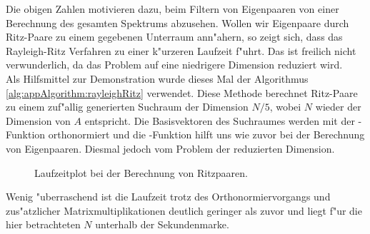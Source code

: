 Die obigen Zahlen motivieren dazu, beim Filtern von Eigenpaaren von einer Berechnung des gesamten Spektrums abzusehen. Wollen wir Eigenpaare durch Ritz-Paare zu einem gegebenen Unterraum ann"ahern, so zeigt sich, dass das Rayleigh-Ritz Verfahren zu einer k"urzeren Laufzeit f"uhrt. Das ist freilich nicht verwunderlich, da das Problem auf eine niedrigere Dimension reduziert wird.\\

Als Hilfsmittel zur Demonstration wurde dieses Mal der Algorithmus \ref{alg:appAlgorithm:rayleighRitz} verwendet. Diese Methode berechnet Ritz-Paare zu einem zuf"allig generierten Suchraum der Dimension $N/5$, wobei $N$ wieder der Dimension von $A$ entspricht. Die Basisvektoren des Suchraumes werden mit der -Funktion orthonormiert und die -Funktion hilft uns wie zuvor bei der Berechnung von Eigenpaaren. Diesmal jedoch vom Problem der reduzierten Dimension.

\newpage

\begin{figure}[h!]
\centering


\caption{Laufzeitplot bei der Berechnung von Ritzpaaren.}\label{fig:chap5:laufzeitRayleighRitz}
\end{figure}

Wenig "uberraschend ist die Laufzeit trotz des Orthonormiervorgangs und zus"atzlicher Matrixmultiplikationen deutlich geringer als zuvor und liegt f"ur die hier betrachteten $N$ unterhalb der Sekundenmarke.\\

